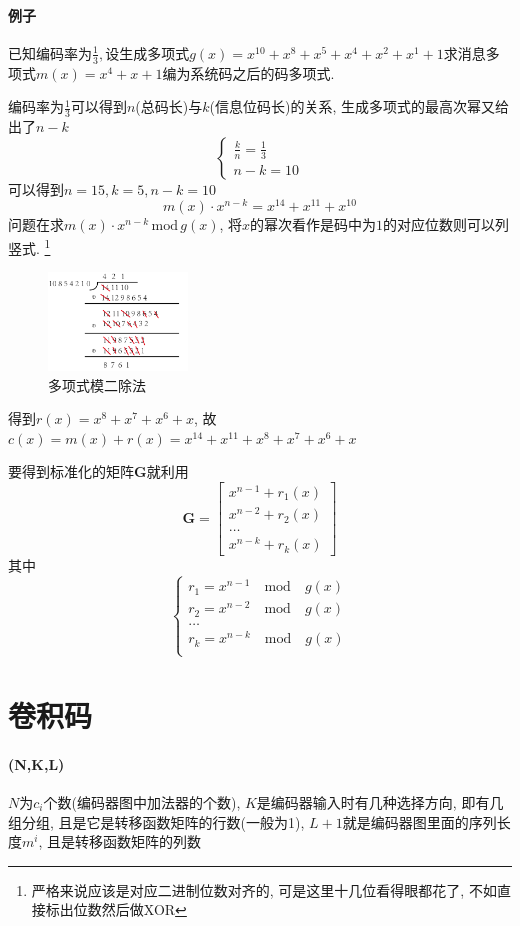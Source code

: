 \documentclass[a4paper]{report}
\begin{document}
\paragraph{例子}
已知编码率为$\frac{1}{3}, $设生成多项式$g(x)=x^{10}+x^8+x^5+x^4+x^2+x^1+1$求消息多项式$m(x)=x^4+x+1$编为系统码之后的码多项式. 

编码率为$\frac{1}{3}$可以得到$n$(总码长)与$k$(信息位码长)的关系, 生成多项式的最高次幂又给出了$n-k$
$$\begin{cases}
  \frac{k}{n}=\frac{1}{3}\\
  n-k=10
\end{cases}
$$
可以得到$n=15,k=5,n-k=10$
$$m(x)\cdot x^{n-k}=x^{14}+x^{11}+x^{10}$$
问题在求$m(x)\cdot x^{n-k}\, \text{mod} \, g(x)$, 将$x$的幂次看作是码中为$1$的对应位数则可以列竖式. \footnote{严格来说应该是对应二进制位数对齐的, 可是这里十几位看得眼都花了, 不如直接标出位数然后做XOR}
\begin{figure}[H]
\centering
\includegraphics[width=0.33\textwidth]{mod2.png}
\caption{多项式模二除法}
\end{figure}
得到$r(x)=x^8+x^7+x^6+x$, 故$c(x)=m(x)+r(x)=x^{14}+x^{11}+x^8+x^7+x^6+x$

要得到标准化的矩阵$\textbf{G}$就利用
\[
  \textbf{G}=
  \begin{bmatrix}
    x^{n-1}+r_1(x)\\
    x^{n-2}+r_2(x)\\
    \dots\\
    x^{n-k}+r_k(x)
  \end{bmatrix}
  \]
  其中$$\begin{cases}
    r_1=x^{n-1}\quad\text{mod}\quad g(x)\\
    r_2=x^{n-2}\quad\text{mod}\quad g(x)\\
    \dots\\
    r_k=x^{n-k}\quad \text{mod}\quad g(x)\\
  \end{cases}$$

\section{卷积码}
\paragraph{(N,K,L)} $N$为$c_i$个数(编码器图中加法器的个数), 
$K$是编码器输入时有几种选择方向, 即有几组分组, 且是它是转移函数矩阵的行数(一般为1), 
$L+1$就是编码器图里面的序列长度$m^{i}$, 且是转移函数矩阵的列数
\end{document}
